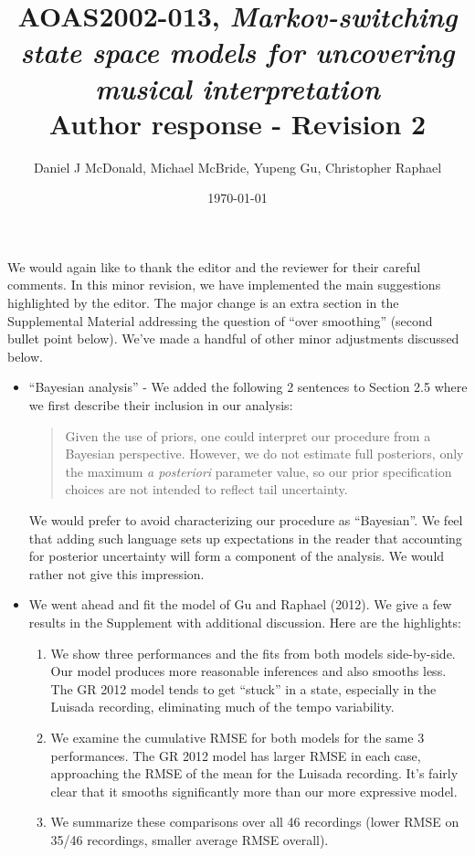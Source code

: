 \documentclass[12pt]{article}
\title{AOAS2002-013, \emph{Markov-switching state space models for uncovering
    musical interpretation} \\
Author response - Revision 2}
\author{Daniel J McDonald, Michael McBride, Yupeng Gu, Christopher Raphael}
\date{\today}
\begin{document}
\maketitle


We would again like to thank the editor and the reviewer for their careful
comments. In this minor revision, we have implemented the main suggestions
highlighted by the editor. The major change is an extra section in the
Supplemental Material addressing the question of ``over smoothing'' (second
bullet point below). We've made a handful of other minor adjustments discussed
below. 

\begin{itemize}
\item ``Bayesian analysis'' - We added the following 2 sentences to Section 2.5
  where we first describe their inclusion in our analysis:
  \begin{quote}
    Given the use of priors, one could interpret our procedure from a Bayesian
    perspective. However, we do not estimate full posteriors, only the maximum
    \emph{a posteriori} parameter value, so our prior specification choices are
    not intended to reflect tail uncertainty.
  \end{quote}
  We would prefer to avoid characterizing our procedure as ``Bayesian''. We
  feel that adding such language sets up expectations in the reader that
  accounting for posterior uncertainty will form a component of the analysis. We
  would rather not give this impression.

\item We went ahead and fit the model of Gu and Raphael (2012). We give a few
  results in the Supplement with additional discussion. Here are the highlights:
  \begin{enumerate}
  \item We show three performances and the fits from both models
    side-by-side. Our model produces more reasonable inferences and also
    smooths less. The GR 2012 model tends to get ``stuck'' in a state,
    especially in the Luisada recording, eliminating much of the tempo
    variability.
  \item We examine the cumulative RMSE for both models for the same
    3 performances. The GR 2012 model has larger RMSE in each case, approaching
    the RMSE of the mean for the Luisada recording. It's fairly clear that it
    smooths significantly more than our more expressive model.
  \item We summarize these comparisons over all 46 recordings (lower RMSE on
    35/46 recordings, smaller average RMSE overall).
  \end{enumerate}


\end{itemize}
\end{document}

